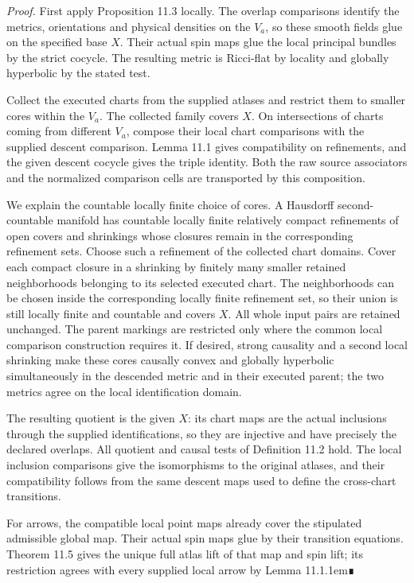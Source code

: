 \documentclass[
  english,
  11pt,
  reqno]{amsart}
\begin{document}
\emph{Proof.} First apply Proposition 11.3 locally. The overlap
comparisons identify the metrics, orientations and physical densities on
the \(V_a\), so these smooth fields glue on the specified base \(X\).
Their actual spin maps glue the local principal bundles by the strict
cocycle. The resulting metric is Ricci-flat by locality and globally
hyperbolic by the stated test.

Collect the executed charts from the supplied atlases and restrict them
to smaller cores within the \(V_a\). The collected family covers \(X\).
On intersections of charts coming from different \(V_a\), compose their
local chart comparisons with the supplied descent comparison. Lemma 11.1
gives compatibility on refinements, and the given descent cocycle gives
the triple identity. Both the raw source associators and the normalized
comparison cells are transported by this composition.

We explain the countable locally finite choice of cores. A Hausdorff
second-countable manifold has countable locally finite relatively
compact refinements of open covers and shrinkings whose closures remain
in the corresponding refinement sets. Choose such a refinement of the
collected chart domains. Cover each compact closure in a shrinking by
finitely many smaller retained neighborhoods belonging to its selected
executed chart. The neighborhoods can be chosen inside the corresponding
locally finite refinement set, so their union is still locally finite
and countable and covers \(X\). All whole input pairs are retained
unchanged. The parent markings are restricted only where the common
local comparison construction requires it. If desired, strong causality
and a second local shrinking make these cores causally convex and
globally hyperbolic simultaneously in the descended metric and in their
executed parent; the two metrics agree on the local identification
domain.

The resulting quotient is the given \(X\): its chart maps are the actual
inclusions through the supplied identifications, so they are injective
and have precisely the declared overlaps. All quotient and causal tests
of Definition 11.2 hold. The local inclusion comparisons give the
isomorphisms to the original atlases, and their compatibility follows
from the same descent maps used to define the cross-chart transitions.

For arrows, the compatible local point maps already cover the stipulated
admissible global map. Their actual spin maps glue by their transition
equations. Theorem 11.5 gives the unique full atlas lift of that map and
spin lift; its restriction agrees with every supplied local arrow by
Lemma 11.1.\nobreak\kern1em∎
\end{document}
